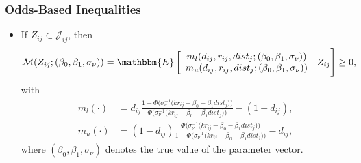 \documentclass[10pt,letterpaper]{beamer}
\begin{document}
\begin{frame}[label=odds]
\frametitle{Odds-Based Inequalities}

\begin{itemize}
	\item If $Z_{ij}\subset\mathcal{J}_{ij}$, then
	\begin{align*}
	\mathcal{M}(Z_{ij};(\beta_{0},\beta_{1},\sigma_{\nu}))=\mathbbm{E}
	\left[
	\begin{array}{c}
	m_{l}(d_{ij},r_{ij},dist_{j};(\beta_{0},\beta_{1},\sigma_{\nu}))\\
	m_{u}(d_{ij},r_{ij},dist_{j};(\beta_{0},\beta_{1},\sigma_{\nu}))\\
	\end{array}\right|
	Z_{ij}
	\Bigg]\geq0,
	\end{align*}
	with
	\begin{align*}
	m_{l}(\cdot)&=d_{ij}\frac{1-\Phi\big(\sigma_{\nu}^{-1}\big(kr_{ij}-\beta_{0}-\beta_{1}dist_{j}\big)\big)}{\Phi\big(\sigma_{\nu}^{-1}\big(kr_{ij}-\beta_{0}-\beta_{1}dist_{j}\big)\big)}-(1-d_{ij}),\\
	m_{u}(\cdot)&=(1-d_{ij})\frac{\Phi\big(\sigma_{\nu}^{-1}\big(kr_{ij}-\beta_{0}-\beta_{1}dist_{j}\big)\big)}{1-\Phi\big(\sigma_{\nu}^{-1}\big(kr_{ij}-\beta_{0}-\beta_{1}dist_{j}\big)\big)}-d_{ij},
	\end{align*}
	where $(\beta_{0},\beta_{1},\sigma_{\nu})$ denotes the true value of the parameter vector.
\end{itemize}
\end{frame}
\end{document}

